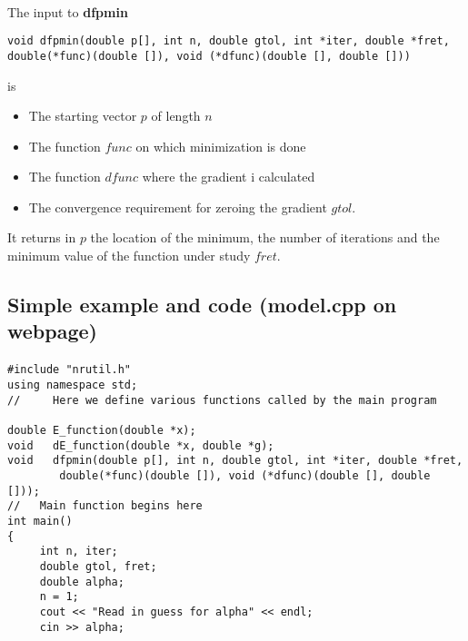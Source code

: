 \documentclass[%
twoside,                 %
final,                   %
10pt]{article}
\begin{document}
\paragraph{}
The input to \textbf{dfpmin}
\begin{verbatim}
void dfpmin(double p[], int n, double gtol, int *iter, double *fret,
double(*func)(double []), void (*dfunc)(double [], double []))
\end{verbatim}
is

\begin{itemize}
  \item The starting vector $p$ of length $n$

  \item The function $func$ on which minimization is done

  \item The function $dfunc$ where the gradient i calculated

  \item The convergence requirement for zeroing the gradient $gtol$.
\end{itemize}

\noindent
It returns in $p$ the location of the minimum, the number of iterations and 
the minimum value of the function under study $fret$.




\subsection*{Simple example and code (model.cpp on webpage)}

\paragraph{}
\begin{verbatim}
#include "nrutil.h"
using namespace std;
//     Here we define various functions called by the main program

double E_function(double *x);
void   dE_function(double *x, double *g);
void   dfpmin(double p[], int n, double gtol, int *iter, double *fret,
	    double(*func)(double []), void (*dfunc)(double [], double []));
//   Main function begins here
int main()
{
     int n, iter;
     double gtol, fret;
     double alpha;
     n = 1;
     cout << "Read in guess for alpha" << endl;
     cin >> alpha;
\end{verbatim}
\end{document}

